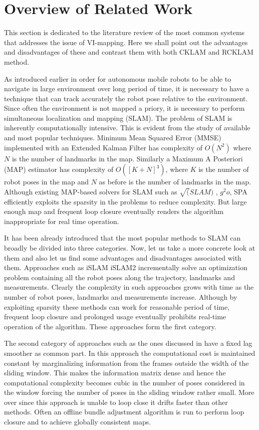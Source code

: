 \section{Overview of Related Work}
This section is dedicated to the literature review of the most common systems that addresses the issue of VI-mapping. Here we shall point out the advantages and disadvantages of these and contrast them with both CKLAM and RCKLAM method.
 
As introduced earlier in order for autonomous mobile robots to be able to navigate in large environment over long period of time, it is necessary to have a technique that can track accurately the robot pose relative to the environment. Since often the environment is not mapped a priory, it is necessary to perform simultaneous localization and mapping (SLAM). The problem of SLAM is inherently computationally intensive. This is evident from the study of available and most popular techniques. Minimum Mean Squared Error (MMSE)\cite{EkFSLAM} implemented with an Extended Kalman Filter has complexity of $O(N^2)$ where $N$ is the number of landmarks in the map. Similarly a Maximum A Posteriori (MAP) estimator\cite{FULL-BA-BASED} has complexity of $O([K+N]^3)$, where $K$ is the number of robot poses in the map and $N$ as before is the number of landmarks in the map. Although existing MAP-based solvers for SLAM such as $\sqrt(SLAM)$ \cite{FULL-BA-BASED}, $g^2o$\cite{g2o}, SPA \cite{spaBYkonolige} efficiently exploits the sparsity in the problems to reduce complexity. But large enough map and frequent loop closure eventually renders the algorithm inappropriate for real time operation.

It has been already introduced that the most popular methods to SLAM can broadly be divided into three categories. Now, let us take a more concrete look at them and also let us find some advantages and disadvantages associated with them. Approaches such as iSLAM\cite{Kaess08thesis} iSLAM2\cite{Kaess01022012} incrementally solve an optimization problem containing all the robot poses along the trajectory, landmarks and measurements. Clearly the complexity in such approaches grows with time as the number of robot poses, landmarks and measurements increase. Although by exploiting sparsity these methods can work for reasonable period of time, frequent loop closure and prolonged usage eventually prohibits real-time operation of the algorithm. These approaches form the first category.

The second category of approaches such as the ones discussed in \cite {Sibley:2010, 4801600} have a fixed lag smoother as common part. In this approach the computational cost is maintained constant by marginalizing information from the frames outside the width of the sliding window. This makes the information matrix dense and hence the computational complexity becomes cubic in the number of poses considered in the window forcing the number of poses in the sliding window rather small. More over since this approach is unable to loop close it drifts faster than other methods. Often an offline bundle adjustment algorithm is run to perform loop closure and to achieve globally consistent maps.

